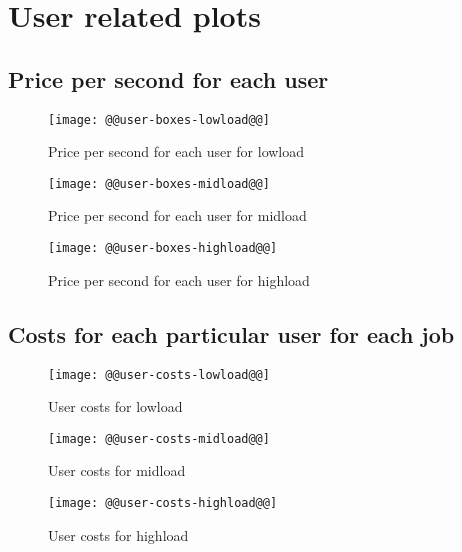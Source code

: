 \documentclass[11pt]{article}
\begin{document}
\newpage
\section{User related plots}
\subsection{Price per second for each user}
\begin{figure}[htbp]
  \begin{center}
    \texttt{[image: @@user-boxes-lowload@@]}
    \caption{Price per second for each user for lowload}
    \label{fig:user-boxes-lowload}
  \end{center}
\end{figure}
\begin{figure}[htbp]
  \begin{center}
    \texttt{[image: @@user-boxes-midload@@]}
    \caption{Price per second for each user for midload}
    \label{fig:user-boxes-midload}
  \end{center}
\end{figure}
\begin{figure}[htbp]
  \begin{center}
    \texttt{[image: @@user-boxes-highload@@]}
    \caption{Price per second for each user for highload}
    \label{fig:user-boxes-highload}
  \end{center}
\end{figure}

\subsection{Costs for each particular user for each job}
\begin{figure}[htbp]
  \begin{center}
    \texttt{[image: @@user-costs-lowload@@]}
    \caption{User costs for lowload}
    \label{fig:user-costs-lowload}
  \end{center}
\end{figure}
\begin{figure}[htbp]
  \begin{center}
    \texttt{[image: @@user-costs-midload@@]}
    \caption{User costs for midload}
    \label{fig:user-costs-midload}
  \end{center}
\end{figure}
\begin{figure}[htbp]
  \begin{center}
    \texttt{[image: @@user-costs-highload@@]}
    \caption{User costs for highload}
    \label{fig:user-costs-highload}
  \end{center}
\end{figure}
\end{document}
